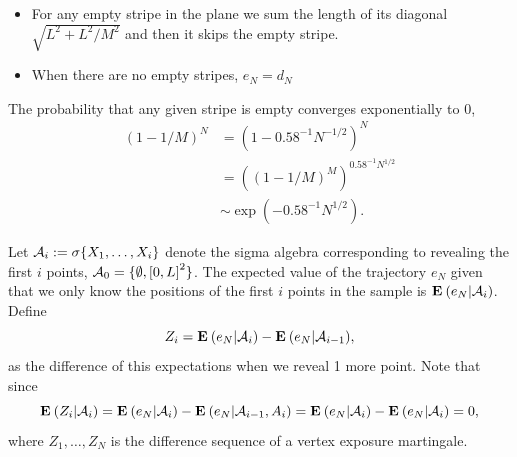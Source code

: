 \begin{itemize}
    \item For any empty stripe in the plane we sum the length of its diagonal $\sqrt{L^2+ L^2/M^2}$ and then it skips the empty stripe.
    \item When there are no empty stripes, $e_N = d_N$ 
\end{itemize}

 The probability that any given stripe is empty converges exponentially to 0,
\[ \begin{array}{rl}
    {(1- 1/M)}^N & = {(1- 0.58^{-1} N^{-1/2})}^N\\[1em]
    & = {\left({(1- 1/M)}^{M}\right)}^{0.58^{-1} N^{1/2}}\\[1em]
    &  \sim \exp(-0.58^{-1} N^{1/2}).
\end{array} \] 




Let $\mathcal{A}_i := \sigma\{X_1,\ldots,X_i\}$ denote the sigma algebra corresponding to revealing the first $i$ points, $\mathcal{A}_0 = \{\emptyset, {[0,L]}^2\}$. The expected value of the trajectory $e_N$ given that we only know the positions of the first $i$ points in the sample is $\mathbf{E}\: (e_N | \mathcal{A}_i)$. Define
\[ Z_i = \mathbf{E}\: (e_N | \mathcal{A}_i) - \mathbf{E}\: (e_N | \mathcal{A}_{i-1}),  \]  
as the difference of this expectations when we reveal 1 more point. Note that since
\[ \mathbf{E}\:(Z_i | \mathcal{A}_i) =  \mathbf{E}\: (e_N | \mathcal{A}_i) - \mathbf{E}\: (e_N | \mathcal{A}_{i-1}, A_i) = \mathbf{E}\: (e_N | \mathcal{A}_i) - \mathbf{E}\: (e_N | \mathcal{A}_i) = 0,\] 
where $Z_1, \ldots, Z_N$ is the difference sequence of a vertex exposure martingale.

